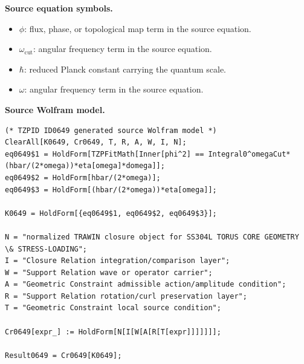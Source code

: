 \begin{minipage}[t]{0.49\linewidth}
\begingroup
\small
\raggedright
\textbf{Source equation symbols.}\par
\begin{itemize}[leftmargin=1.35em,itemsep=1pt,topsep=1pt,parsep=0pt]
    \item $\phi$: flux, phase, or topological map term in the source equation.
    \item $\omega_{\mathrm{cut}}$: angular frequency term in the source equation.
    \item $\hbar$: reduced Planck constant carrying the quantum scale.
    \item $\omega$: angular frequency term in the source equation.
\end{itemize}
\endgroup
\end{minipage}\hfill
\begin{minipage}[t]{0.47\linewidth}
\begingroup
\scriptsize
\raggedright
\textbf{Source Wolfram model.}\par
\begin{Verbatim}[fontsize=\tiny,breaklines=true,breakanywhere=true]
(* TZPID ID0649 generated source Wolfram model *)
ClearAll[K0649, Cr0649, T, R, A, W, I, N];
eq0649$1 = HoldForm[TZPFitMath[Inner[phi^2] == Integral0^omegaCut*(hbar/(2*omega))*eta[omega]*domega]];
eq0649$2 = HoldForm[hbar/(2*omega)];
eq0649$3 = HoldForm[(hbar/(2*omega))*eta[omega]];

K0649 = HoldForm[{eq0649$1, eq0649$2, eq0649$3}];

N = "normalized TRAWIN closure object for SS304L TORUS CORE GEOMETRY \& STRESS-LOADING";
I = "Closure Relation integration/comparison layer";
W = "Support Relation wave or operator carrier";
A = "Geometric Constraint admissible action/amplitude condition";
R = "Support Relation rotation/curl preservation layer";
T = "Geometric Constraint local source condition";

Cr0649[expr_] := HoldForm[N[I[W[A[R[T[expr]]]]]]];

Result0649 = Cr0649[K0649];
\end{Verbatim}
\endgroup
\end{minipage}

